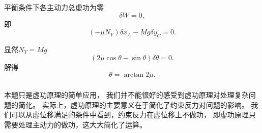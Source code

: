 平衡条件下各主动力总虚功为零
\[\delta W=0,\]
即
\[(-\mu N_Y)\delta x_A-Mg\delta y_C=0.\]

显然\(N_Y=Mg\)
\[(2\mu\cos\theta-\sin\theta)\delta\theta=0.\]
解得
\[\theta=\arctan2\mu.\]

\subsubsection*{}

本题只是虚功原理的简单应用，
我们并不能很好的感受到虚功原理对处理复杂问题的简化。
实际上，虚功原理的主要意义在于简化了约束反力对问题的影响。
我们可以从虚位移满足的条件中看到，约束反力在虚位移上不做功，
即虚功原理只需要处理主动力的做功，这大大简化了运算。
